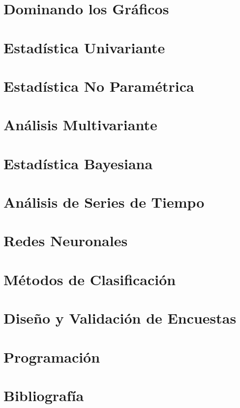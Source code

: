 \documentclass[
  letterpaper,
  DIV=11,
  numbers=noendperiod]{scrreprt}
\begin{document}

\chapter{Dominando los Gráficos}\label{dominando-los-gruxe1ficos}


\chapter{Estadística Univariante}\label{estaduxedstica-univariante}


\chapter{Estadística No
Paramétrica}\label{estaduxedstica-no-paramuxe9trica}


\chapter{Análisis Multivariante}\label{anuxe1lisis-multivariante}


\chapter{Estadística Bayesiana}\label{estaduxedstica-bayesiana}


\chapter{Análisis de Series de
Tiempo}\label{anuxe1lisis-de-series-de-tiempo}


\chapter{Redes Neuronales}\label{redes-neuronales}


\chapter{Métodos de Clasificación}\label{muxe9todos-de-clasificaciuxf3n}


\chapter{Diseño y Validación de
Encuestas}\label{diseuxf1o-y-validaciuxf3n-de-encuestas}


\chapter{Programación}\label{programaciuxf3n}


\chapter{Bibliografía}\label{bibliografuxeda}
\end{document}
